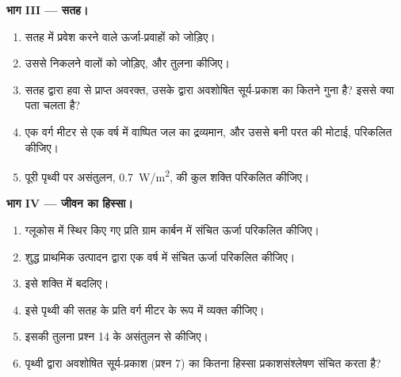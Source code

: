 \begin{problem}
\medskip
\noindent\textbf{भाग III --- सतह।}
\begin{enumerate}[resume]
  \item सतह में प्रवेश करने वाले ऊर्जा-प्रवाहों को जोड़िए।
  \item उससे निकलने वालों को जोड़िए, और तुलना कीजिए।
  \item सतह द्वारा हवा से प्राप्त अवरक्त, उसके द्वारा अवशोषित सूर्य-प्रकाश का कितने गुना
        है? इससे क्या पता चलता है?
  \item एक वर्ग मीटर से एक वर्ष में वाष्पित जल का द्रव्यमान, और उससे बनी परत की मोटाई,
        परिकलित कीजिए।
  \item पूरी पृथ्वी पर असंतुलन, \qty{0.7}{W/m^2}, की कुल
        शक्ति परिकलित कीजिए।
\end{enumerate}

\medskip
\noindent\textbf{भाग IV --- जीवन का हिस्सा।}
\begin{enumerate}[resume]
  \item ग्लूकोस में स्थिर किए गए प्रति ग्राम कार्बन में संचित ऊर्जा परिकलित कीजिए।
  \item शुद्ध प्राथमिक उत्पादन द्वारा एक वर्ष में संचित ऊर्जा परिकलित कीजिए।
  \item इसे शक्ति में बदलिए।
  \item इसे पृथ्वी की सतह के प्रति वर्ग मीटर के रूप में व्यक्त कीजिए।
  \item इसकी तुलना प्रश्न 14 के असंतुलन से कीजिए।
  \item पृथ्वी द्वारा अवशोषित सूर्य-प्रकाश (प्रश्न 7) का कितना हिस्सा
        प्रकाशसंश्लेषण संचित करता है?
\end{enumerate}
\end{problem}
